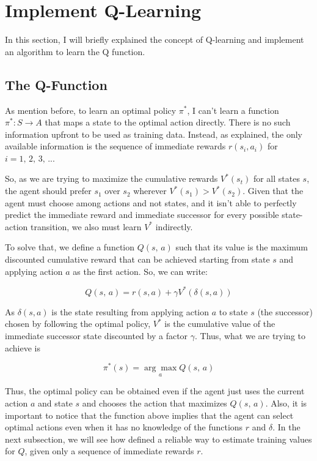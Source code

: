 \documentclass[a4paper]{article}
\begin{document}
\section{Implement Q-Learning}
\label{sec:implement_q_learning}
In this section, I will briefly explained the concept of Q-learning and implement an algorithm to learn the Q function.

\subsection{The Q-Function}
As mention before, to learn an optimal policy $\pi^{*}$, I can't learn a function $\pi^{*}: S \rightarrow A$ that maps a state to the optimal action directly. There is no such information upfront to be used as training data. Instead, as \cite{Mitchell} explained, the only available information is the sequence of immediate rewards $r(s_i, a_i)$ for $i=1,\, 2,\, 3,\,...$

So, as we are trying to maximize the cumulative rewards $V^{*}(s_t)$ for all states $s$, the agent should prefer $s_1$ over $s_2$ wherever $V^{*}(s_1) > V^{*}(s_2)$. Given that the agent must choose among actions and not states, and it isn't able to perfectly predict the immediate reward and immediate successor for every possible state-action transition, we also must learn $V^{*}$ indirectly.

To solve that, we define a function $Q(s, \, a)$ such that its value is the maximum discounted cumulative reward that can be achieved starting from state $s$ and applying action $a$ as the first action. So, we can write:

$$Q(s, \, a) = r(s, a) + \gamma V^{*}(\delta(s, a))$$

As $\delta(s, a)$ is the state resulting from applying action $a$ to state $s$ (the successor) chosen by following the optimal policy, $V^{*}$ is the cumulative value of the immediate successor state discounted by a factor $\gamma$. Thus,  what we are trying to achieve is

$$\pi^{*}(s) = \underset{a}{\arg \max} Q(s, \, a)$$

Thus, the optimal policy can be obtained even if the agent just uses the current action $a$ and state $s$ and chooses the action that maximizes $Q(s,\, a)$. Also, it is important to notice that the function above implies that the agent can select optimal actions even when it has no knowledge of the functions $r$ and $\delta$. In the next subsection, we will see how \cite{Mitchell} defined a reliable way to estimate training values for $Q$, given only a sequence of immediate rewards $r$.
\end{document}
